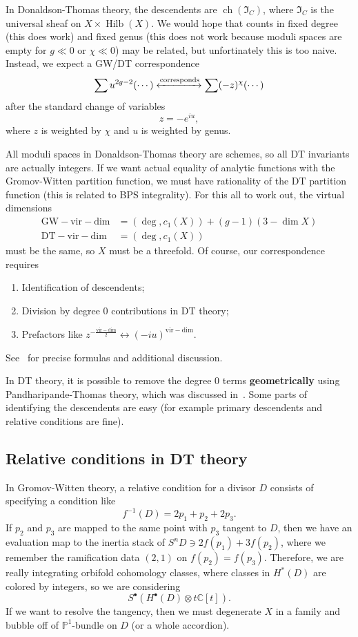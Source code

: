 \documentclass[leqno, openany]{memoir}
\theoremstyle{definition}
\theoremstyle{remark}
\theoremstyle{plain}
\theoremstyle{definition}
\theoremstyle{remark}
\newcommand{\C}{\mathbb{C}}
\renewcommand{\P}{\mathbb{P}}
\newcommand{\mf}[1]{\mathfrak{#1}}
\newcommand{\mr}[1]{\mathrm{#1}}
\DeclareMathOperator{\ch}{ch}
\DeclareMathOperator{\Hilb}{Hilb}
\begin{document}
In Donaldson-Thomas theory, the descendents are $\ch(\mf{I}_C)$, where $\mf{I}_C$ is the universal sheaf on $X \times \Hilb(X)$. We would hope that counts in fixed degree (this does work) and fixed genus (this does not work because moduli spaces are empty for $g \ll 0$ or $\chi \ll 0$) may be related, but unfortinately this is too naive. Instead, we expect a GW/DT correspondence
\[ \sum u^{2g-2} (\cdots) \xleftrightarrow{\text{corresponds}} \sum (-z)^{\chi} (\cdots) \]
after the standard change of variables
\[ z = -e^{iu}, \]
where $z$ is weighted by $\chi$ and $u$ is weighted by genus.

All moduli spaces in Donaldson-Thomas theory are schemes, so all DT invariants are actually integers. If we want actual equality of analytic functions with the Gromov-Witten partition function, we must have rationality of the DT partition function (this is related to BPS integrality). For this all to work out, the virtual dimensions
\begin{align*}
    \mr{GW-vir-dim} &= (\deg, c_1(X)) + (g-1)(3-\dim X) \\
    \mr{DT-vir-dim} &= (\deg, c_1(X))
\end{align*}
must be the same, so $X$ must be a threefold. Of course, our correspondence requires
\begin{enumerate}
    \item Identification of descendents;
    \item Division by degree $0$ contributions in DT theory;
    \item Prefactors like $z^{-\frac{\mr{vir-dim}}{2}} \leftrightarrow (-iu)^{\mr{vir-dim}}$.
\end{enumerate}
See~\cite{takagidt} for precise formulas and additional discussion.

In DT theory, it is possible to remove the degree $0$ terms \textbf{geometrically} using Pandharipande-Thomas theory, which was discussed in~. Some parts of identifying the descendents are easy (for example primary descendents and relative conditions are fine). 

\subsection{Relative conditions in DT theory}

In Gromov-Witten theory, a relative condition for a divisor $D$ consists of specifying a condition like 
\[ f^{-1}(D) = 2p_1 + p_2 + 2 p_3. \] 
If $p_2$ and $p_3$ are mapped to the same point with $p_3$ tangent to $D$, then we have an evaluation map to the inertia stack of $S^n D \ni 2 f(p_1) + 3 f(p_2)$, where we remember the ramification data $(2,1)$ on $f(p_2) = f(p_3)$. Therefore, we are really integrating orbifold cohomology classes, where classes in $H^*(D)$ are colored by integers, so we are considering
\[ S^{\bullet} (H^{\bullet}(D) \otimes t \C[t]). \]
If we want to resolve the tangency, then we must degenerate $X$ in a family and bubble off of $\P^1$-bundle on $D$ (or a whole accordion).
\end{document}
